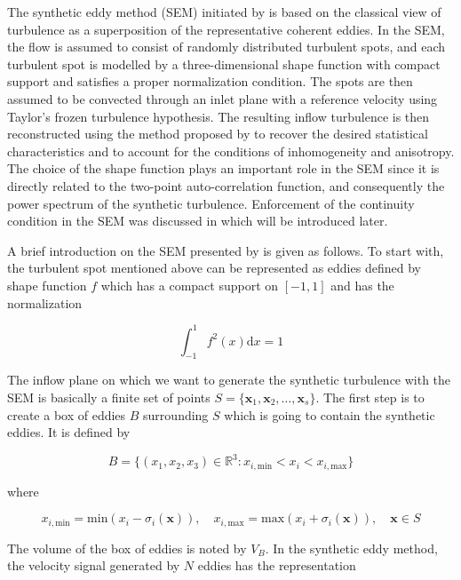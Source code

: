 The synthetic eddy method (SEM) initiated by \cite{jarrin2006} is based on the classical view of turbulence as a superposition of the representative coherent eddies. In the SEM, the flow is assumed to consist of randomly distributed turbulent spots, and each turbulent spot is modelled by a three-dimensional shape function with compact support and satisfies a proper normalization condition. The spots are then assumed to be convected through an inlet plane with a reference velocity using Taylor's frozen turbulence hypothesis. The resulting inflow turbulence is then reconstructed using the method proposed by to recover the desired statistical characteristics and to account for the conditions of inhomogeneity and anisotropy. The choice of the shape function plays an important role in the SEM since it is directly related to the two-point auto-correlation function, and consequently the power spectrum of the synthetic turbulence. Enforcement of the continuity condition in the SEM was discussed in \cite{poletto2013} which will be introduced later.

A brief introduction on the SEM presented by \cite{jarrin2006} is given as follows. To start with, the turbulent spot mentioned above can be represented as eddies defined by shape function $f$ which has a compact support on $[-1,1]$ and has the normalization

\begin{equation} \label{normalization}
\int_{-1}^1 f^2(x) \mathrm{d}x = 1
\end{equation}

\noindent The inflow plane on which we want to generate the synthetic turbulence with the SEM is basically a finite set of points $S = \{\boldsymbol{x}_1,\boldsymbol{x}_2,\ldots,\boldsymbol{x}_s\}$. The first step is to create a box of eddies $B$ surrounding $S$ which is going to contain the synthetic eddies. It is defined by

\begin{equation}
B = \big\{(x_1,x_2,x_3)\in \mathbb{R}^3: x_{i,\text{min}}<x_i<x_{i,\text{max}}\big\}
\end{equation}

\noindent where

\begin{equation}
x_{i,\text{min}} = \text{min}(x_i-\sigma_i(\boldsymbol{x})), \quad x_{i,\text{max}} = \text{max}(x_i+\sigma_i(\boldsymbol{x})), \quad \boldsymbol{x}\in S
\end{equation}

\noindent The volume of the box of eddies is noted by $V_B$. In the synthetic eddy method, the velocity signal generated by $N$ eddies has the representation


